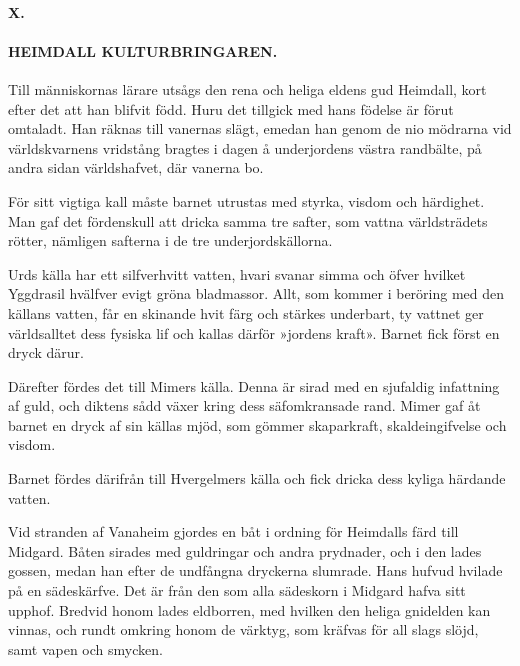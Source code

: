 \bye

\paragraph{X.}

\paragraph{HEIMDALL KULTURBRINGAREN.}

Till människornas lärare utsågs den rena och heliga eldens gud Heimdall,
kort efter det att han blifvit född. Huru det tillgick med hans födelse
är förut omtaladt. Han räknas till vanernas slägt, emedan han genom de
nio mödrarna vid världskvarnens vridstång bragtes i dagen å underjordens
västra randbälte, på andra sidan världshafvet, där vanerna bo.

För sitt vigtiga kall måste barnet utrustas med styrka, visdom och
härdighet. Man gaf det fördenskull att dricka samma tre safter, som
vattna världsträdets rötter, nämligen safterna i de tre
underjordskällorna.

Urds källa har ett silfverhvitt vatten, hvari svanar simma och öfver
hvilket Yggdrasil hvälfver evigt gröna bladmassor. Allt, som kommer i
beröring med den källans vatten, får en skinande hvit färg och stärkes
underbart, ty vattnet ger världsalltet dess fysiska lif och kallas
därför »jordens kraft». Barnet fick först en dryck därur.

\protect\hypertarget{lb1625905.xhtmlux5cux23start21}{}{}\protect\hypertarget{lb1625905.xhtmlux5cux23start21-a}{}{}\protect\hypertarget{lb1625905.xhtmlux5cux23start21-b}{}{}\protect\hypertarget{lb1625905.xhtmlux5cux23start21-c}{}{}\protect\hypertarget{lb1625905.xhtmlux5cux23start21-d}{}{}

Därefter fördes det till Mimers källa. Denna är sirad med en sjufaldig
infattning af guld, och diktens sådd växer kring dess säfomkransade
rand. Mimer gaf åt barnet en dryck af sin källas mjöd, som gömmer
skaparkraft, skaldeingifvelse och visdom.

Barnet fördes därifrån till Hvergelmers källa och fick dricka dess
kyliga härdande vatten.

Vid stranden af Vanaheim gjordes en båt i ordning för Heimdalls färd
till Midgard. Båten sirades med guldringar och andra prydnader, och i
den lades gossen, medan han efter de undfångna dryckerna slumrade. Hans
hufvud hvilade på en sädeskärfve. Det är från den som alla sädeskorn i
Midgard hafva sitt upphof. Bredvid honom lades eldborren, med hvilken
den heliga gnidelden kan vinnas, och rundt omkring honom de värktyg, som
kräfvas för all slags slöjd, samt vapen och smycken.

